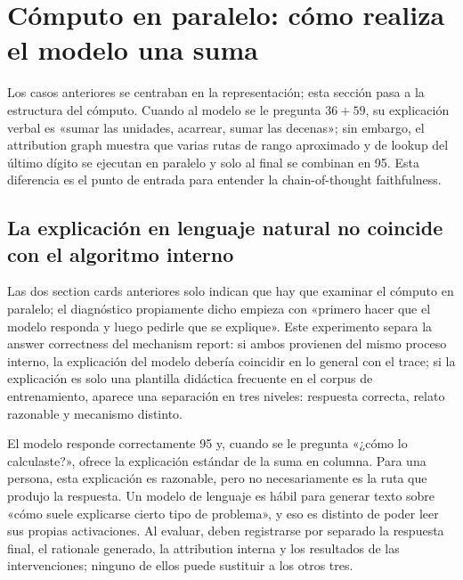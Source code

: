 \section{Cómputo en paralelo: cómo realiza el modelo una suma}

Los casos anteriores se centraban en la representación; esta sección pasa a la estructura del cómputo. Cuando al modelo se le pregunta $36+59$, su explicación verbal es «sumar las unidades, acarrear, sumar las decenas»; sin embargo, el attribution graph muestra que varias rutas de rango aproximado y de lookup del último dígito se ejecutan en paralelo y solo al final se combinan en 95. Esta diferencia es el punto de entrada para entender la chain-of-thought faithfulness.



\subsection{La explicación en lenguaje natural no coincide con el algoritmo interno}

Las dos section cards anteriores solo indican que hay que examinar el cómputo en paralelo; el diagnóstico propiamente dicho empieza con «primero hacer que el modelo responda y luego pedirle que se explique». Este experimento separa la answer correctness del mechanism report: si ambos provienen del mismo proceso interno, la explicación del modelo debería coincidir en lo general con el trace; si la explicación es solo una plantilla didáctica frecuente en el corpus de entrenamiento, aparece una separación en tres niveles: respuesta correcta, relato razonable y mecanismo distinto.

El modelo responde correctamente 95 y, cuando se le pregunta «¿cómo lo calculaste?», ofrece la explicación estándar de la suma en columna. Para una persona, esta explicación es razonable, pero no necesariamente es la ruta que produjo la respuesta. Un modelo de lenguaje es hábil para generar texto sobre «cómo suele explicarse cierto tipo de problema», y eso es distinto de poder leer sus propias activaciones. Al evaluar, deben registrarse por separado la respuesta final, el rationale generado, la attribution interna y los resultados de las intervenciones; ninguno de ellos puede sustituir a los otros tres.


